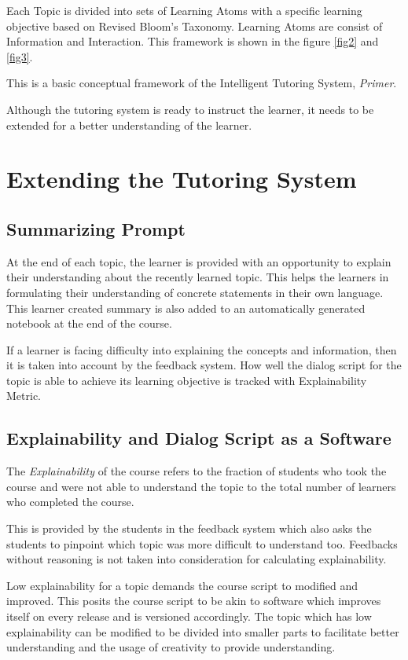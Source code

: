 \documentclass[]{article}
\begin{document}
Each Topic is divided into sets of Learning Atoms with a specific learning objective based on Revised Bloom's Taxonomy. Learning Atoms are consist of Information and Interaction. This framework is shown in the figure \ref{fig2} and \ref{fig3}.



This is a basic conceptual framework of the Intelligent Tutoring System, \textit{Primer}. 

Although the tutoring system is ready to instruct the learner, it needs to be extended for a better understanding of the learner. 


\section[Extending the System]{Extending the Tutoring System} 

\subsection[Summarizing]{Summarizing Prompt}
At the end of each topic, the learner is provided with an opportunity to explain their understanding about the recently learned topic. This helps the learners in formulating their understanding of concrete statements in their own language. This learner created summary is also added to an automatically generated notebook at the end of the course.  

If a learner is facing difficulty into explaining the concepts and information, then it is taken into account by the feedback system. How well the dialog script for the topic is able to achieve its learning objective is tracked with Explainability Metric.

\subsection[Explainability]{Explainability and Dialog Script as a Software}

The \textit{Explainability} of the course refers to the fraction of students who took the course and were not able to understand the topic to the total number of learners who completed the course.

This is provided by the students in the feedback system which also asks the students to pinpoint which topic was more difficult to understand too. Feedbacks without reasoning is not taken into consideration for calculating explainability.

Low explainability for a topic demands the course script to modified and improved. This posits the course script to be akin to software which improves itself on every release and is versioned accordingly. The topic which has low explainability can be modified to be divided into smaller parts to facilitate better understanding and the usage of creativity to provide understanding.
\end{document}
